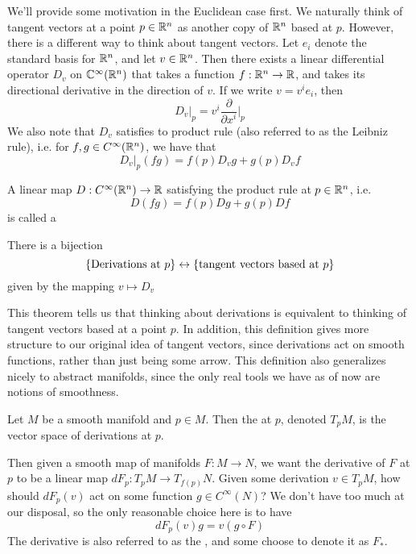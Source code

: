 We'll provide some motivation in the Euclidean case first. We naturally
think of tangent vectors at a point $p \in \mathbb{R}^n$ as another copy of $\mathbb{R}^n$
based at $p$. However, there is a different way to think about tangent
vectors. Let $e_i$ denote the standard basis for $\mathbb{R}^n$, and let $v \in
\mathbb{R}^n$. Then there exists a linear differential operator $D_v$ on
$\mathbb{C}^\infty(\mathbb{R}^n)$ that takes a function $f: \mathbb{R}^n \to \mathbb{R}$, and takes its
directional derivative in the direction of $v$. If we write $v = v^ie_i$,
then
$$D_v\vert_p = v^i\frac{\partial}{\partial x^i}\bigg\vert_p $$
We also note that $D_v$ satisfies to product rule (also referred to as
the Leibniz rule), i.e. for $f,g \in C^\infty(\mathbb{R}^n)$, we have that
$$D_v\vert_p(fg) = f(p)D_vg + g(p)D_vf$$
\begin{defn}
	A linear map $D : C^\infty(\mathbb{R}^n) \to \mathbb{R}$ satisfying the product rule at $p \in \mathbb{R}^n$,
	i.e.
	$$D(fg) = f(p)Dg + g(p)Df$$
	is called a 
\end{defn}
%
\begin{thm}
	There is a bijection
	$$\left\lbrace \text{Derivations at } p \right\rbrace \leftrightarrow
	\left\lbrace \text{tangent vectors based at } p \right\rbrace  $$
	given by the mapping $v \mapsto D_v$
\end{thm}
%
This theorem tells us that thinking about derivations is equivalent to thinking
of tangent vectors based at a point $p$. In addition, this definition gives
more structure to our original idea of tangent vectors, since derivations act
on smooth functions, rather than just being some arrow. This definition also
generalizes nicely to abstract manifolds, since the only real tools we have
as of now are notions of smoothness.
%
\begin{defn}
	Let $M$ be a smooth manifold and $p \in M$. Then the  at
	$p$, denoted $T_pM$, is the vector space of derivations at $p$.
\end{defn}
%
Then given a smooth map of manifolds $F: M \to N$, we want the derivative of $F$
at $p$ to be a linear map $dF_p : T_pM \to T_{f(p)}N$. Given some derivation
$v \in T_pM$, how should $dF_p(v)$ act on some function $g \in C^\infty(N)$?
We don't have too much at our disposal, so the only reasonable choice here is
to have
$$dF_p(v)g = v(g \circ F) $$
The derivative is also referred to as the , and some choose
to denote it as $F_*$.\\

